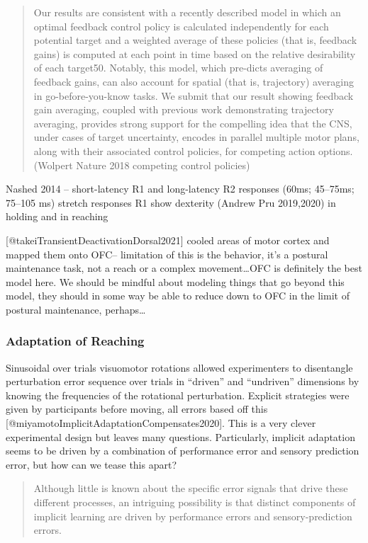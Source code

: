 \documentclass[../main.tex]{subfiles}
\begin{document}
{{{{{{{{{{{\begin{quote}
Our results are consistent with a recently described model in which an
optimal feedback control policy is calculated independently for each
potential target and a weighted average of these policies (that is,
feedback gains) is computed at each point in time based on the relative
desirability of each target50. Notably, this model, which pre-dicts
averaging of feedback gains, can also account for spatial (that is,
trajectory) averaging in go-before-you-know tasks. We submit that our
result showing feedback gain averaging, coupled with previous work
demonstrating trajectory averaging, provides strong support for the
compelling idea that the CNS, under cases of target uncertainty, encodes
in parallel multiple motor plans, along with their associated control
policies, for competing action options. (Wolpert Nature 2018 competing
control policies)
\end{quote}

Nashed 2014 -- short-latency R1 and long-latency R2 responses (60ms;
45--75ms; 75--105 ms) stretch responses R1 show dexterity (Andrew Pru
2019,2020) in holding and in reaching

{[}@takeiTransientDeactivationDorsal2021{]} cooled areas of motor cortex
and mapped them onto OFC-- limitation of this is the behavior, it's a
postural maintenance task, not a reach or a complex movement\ldots OFC
is definitely the best model here. We should be mindful about modeling
things that go beyond this model, they should in some way be able to
reduce down to OFC in the limit of postural maintenance, perhaps\ldots{}

\subsubsection{Adaptation of Reaching}\label{adaptation-of-reaching}

Sinusoidal over trials visuomotor rotations allowed experimenters to
disentangle perturbation error sequence over trials in ``driven'' and
``undriven'' dimensions by knowing the frequencies of the rotational
perturbation. Explicit strategies were given by participants before
moving, all errors based off this
{[}@miyamotoImplicitAdaptationCompensates2020{]}. This is a very clever
experimental design but leaves many questions. Particularly, implicit
adaptation seems to be driven by a combination of performance error and
sensory prediction error, but how can we tease this apart?

\begin{quote}
Although little is known about the specific error signals that drive
these different processes, an intriguing possibility is that distinct
components of implicit learning are driven by performance errors and
sensory-prediction errors.
\end{quote}

}}}}}}}}}}}
\end{document}
